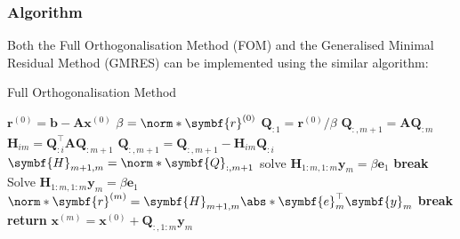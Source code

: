 \documentclass{article}
\begin{document}
\subsubsection{Algorithm}
Both the Full Orthogonalisation Method (FOM) and the Generalised Minimal
Residual Method (GMRES) can be implemented using the similar algorithm:
\begin{algorithm}[H]
    \caption{Full Orthogonalisation Method}
    \begin{algorithmic}
        \State \(\symbf{r}^{\left( 0 \right)} = \symbf{b} - \symbf{A} \symbf{x}^{\left( 0 \right)}\)
        \State \(\beta = \norm*{\symbf{r}^{\left( 0 \right)}}\)
        \State \(\symbf{Q}_{:1} = \symbf{r}^{\left( 0 \right)}/\beta\)
            \State \(\symbf{Q}_{:,m+1} = \symbf{A} \symbf{Q}_{:m}\) 
                \State \(\symbf{H}_{im} = \symbf{Q}_{:i}^\top \symbf{A} \symbf{Q}_{:m + 1}\)
                \State \(\symbf{Q}_{:,m+1} = \symbf{Q}_{:,m+1} - \symbf{H}_{im} \symbf{Q}_{:i}\)
            \EndFor
            \State \(\symbf{H}_{m+1,m} = \norm*{\symbf{Q}_{:,m+1}}\)
            \Statex
             
                \State solve \(\symbf{H}_{1:m,1:m} \symbf{y}_m = \beta \symbf{e}_1\)
                \State \textbf{break}
            \EndIf
            \Statex
            \State Solve \(\symbf{H}_{1:m,1:m} \symbf{y}_m = \beta \symbf{e}_1\) 
            \State \(\norm*{\symbf{r}^{\left( m \right)}} = \symbf{H}_{m+1,m} \abs*{\symbf{e}_m^\top \symbf{y}_m}\)
             
                \State \textbf{break}
            \EndIf
        \EndFor
        \State \textbf{return} \(\symbf{x}^{\left( m \right)} = \symbf{x}^{\left( 0 \right)} + \symbf{Q}_{:,1:m} \symbf{y}_m\)
    \end{algorithmic}
\end{algorithm}
\end{document}
